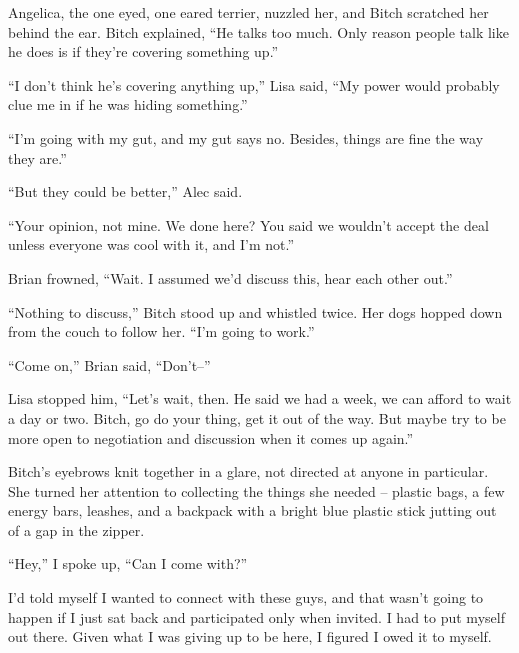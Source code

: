 Angelica, the one eyed, one eared terrier, nuzzled her, and Bitch scratched her behind the ear.  Bitch explained, ``He talks too much.  Only reason people talk like he does is if they're covering something up.''



``I don't think he's covering anything up,'' Lisa said, ``My power would probably clue me in if he was hiding something.''



``I'm going with my gut, and my gut says no.  Besides, things are fine the way they are.''



``But they could be better,'' Alec said.



``Your opinion, not mine.  We done here?  You said we wouldn't accept the deal unless everyone was cool with it, and I'm not.''



Brian frowned, ``Wait.  I assumed we'd discuss this, hear each other out.''



``Nothing to discuss,'' Bitch stood up and whistled twice.  Her dogs hopped down from the couch to follow her.  ``I'm going to work.''



``Come on,'' Brian said, ``Don't--''



Lisa stopped him, ``Let's wait, then.  He said we had a week, we can afford to wait a day or two.  Bitch, go do your thing, get it out of the way.  But maybe try to be more open to negotiation and discussion when it comes up again.''



Bitch's eyebrows knit together in a glare, not directed at anyone in particular.  She turned her attention to collecting the things she needed – plastic bags, a few energy bars, leashes, and a backpack with a bright blue plastic stick jutting out of a gap in the zipper.



``Hey,'' I spoke up, ``Can I come with?''



I'd told myself I wanted to connect with these guys, and that wasn't going to happen if I just sat back and participated only when invited.  I had to put myself out there.  Given what I was giving up to be here, I figured I owed it to myself.



